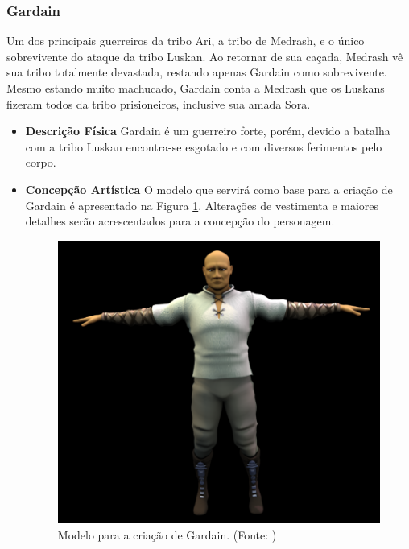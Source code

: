 \subsubsection{Gardain}
Um dos principais guerreiros da tribo Ari, a tribo de Medrash, e o único
 sobrevivente do ataque da tribo Luskan. Ao retornar de sua caçada, Medrash
 vê sua tribo totalmente devastada, restando apenas Gardain como
 sobrevivente. Mesmo estando muito machucado, Gardain conta a Medrash que
 os Luskans fizeram todos da tribo prisioneiros, inclusive sua amada Sora. 
\begin{itemize}
\item {\bf Descrição Física}
Gardain é um guerreiro forte, porém, devido a batalha com a tribo Luskan
 encontra-se esgotado e com diversos ferimentos pelo corpo.
\item {\bf Concepção Artística}
O modelo que servirá como base para a criação de Gardain é apresentado na
 Figura \ref{img:gardain}. Alterações de vestimenta e maiores detalhes
 serão acrescentados para a concepção do personagem.

\begin{figure}[H]
 \centering
 \includegraphics[scale=1]{Imagens/gardain01.png}
 \caption{Modelo para a criação de Gardain. (Fonte: \cite{bib:gardain01})}
\label{img:gardain}
\end{figure}


\end{itemize}
